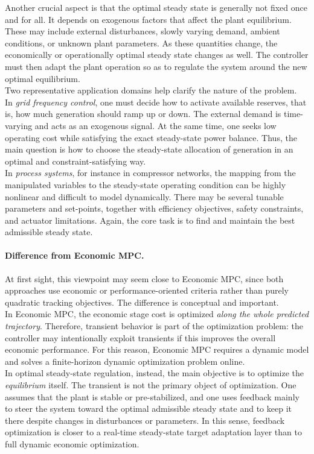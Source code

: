 Another crucial aspect is that the optimal steady state is generally not fixed once and for all. It depends on exogenous factors that affect the plant equilibrium. These may include external disturbances, slowly varying demand, ambient conditions, or unknown plant parameters. As these quantities change, the economically or operationally optimal steady state changes as well. The controller must then adapt the plant operation so as to regulate the system around the new optimal equilibrium.\\

Two representative application domains help clarify the nature of the problem.\\
In \emph{grid frequency control}, one must decide how to activate available reserves, that is, how much generation should ramp up or down. The external demand is time-varying and acts as an exogenous signal. At the same time, one seeks low operating cost while satisfying the exact steady-state power balance. Thus, the main question is how to choose the steady-state allocation of generation in an optimal and constraint-satisfying way.\\
In \emph{process systems}, for instance in compressor networks, the mapping from the manipulated variables to the steady-state operating condition can be highly nonlinear and difficult to model dynamically. There may be several tunable parameters and set-points, together with efficiency objectives, safety constraints, and actuator limitations. Again, the core task is to find and maintain the best admissible steady state.

\paragraph{Difference from Economic MPC.}
At first sight, this viewpoint may seem close to Economic MPC, since both approaches use economic or performance-oriented criteria rather than purely quadratic tracking objectives. The difference is conceptual and important.\\
In Economic MPC, the economic stage cost is optimized \emph{along the whole predicted trajectory}. Therefore, transient behavior is part of the optimization problem: the controller may intentionally exploit transients if this improves the overall economic performance. For this reason, Economic MPC requires a dynamic model and solves a finite-horizon dynamic optimization problem online.\\
In optimal steady-state regulation, instead, the main objective is to optimize the \emph{equilibrium} itself. The transient is not the primary object of optimization. One assumes that the plant is stable or pre-stabilized, and one uses feedback mainly to steer the system toward the optimal admissible steady state and to keep it there despite changes in disturbances or parameters. In this sense, feedback optimization is closer to a real-time steady-state target adaptation layer than to full dynamic economic optimization.\\

